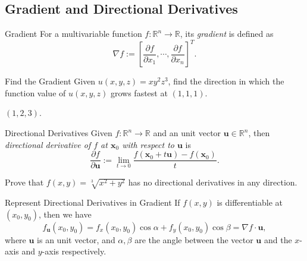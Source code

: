\subsection{Gradient and Directional Derivatives}

\begin{definition}{Gradient}{}
  For a multivariable function $f: \mathbb{R}^n \rightarrow \mathbb{R}$,
  its \emph{gradient} is defined as
  \begin{equation}
    \nabla f := \left[ \frac{\partial f}{\partial x_1},\cdots,\frac{\partial f}{\partial x_n} \right]^T.
  \end{equation}
\end{definition}

\begin{example}{Find the Gradient}{}
  Given $u(x,y,z) = xy^2z^3$, find the direction in which the function value of
  $u(x, y, z)$ grows fastest at $(1,1,1)$.
\end{example}

\begin{solution}
  $(1,2,3)$.
\end{solution}

\begin{definition}{Directional Derivatives}{}
  Given $f: \mathbb{R}^n \rightarrow \mathbb{R}$ and an unit vector $\mathbf{u}
  \in \mathbb{R}^n$, then \emph{directional derivative of $f$ at $\mathbf{x}_0$ with respect to $\mathbf{u}$}
  is
  \begin{equation}
    \frac{\partial f}{\partial \mathbf{u}} := \lim \limits _{t \rightarrow 0} \frac{f(\mathbf{x}_0 + t\mathbf{u}) - f(\mathbf{x}_0)}{t}.
  \end{equation}
\end{definition}

\begin{example}{}{}
  Prove that $f(x,y) = \sqrt[3]{x^2 + y^2}$ has no directional derivatives in
  any direction.
\end{example}

\begin{proposition}{Represent Directional Derivatives in Gradient}{}
  If $f(x, y)$ is differentiable at $(x_0, y_0)$,
  then we have
  \begin{equation}
    f_{\mathbf{u}}(x_0, y_0) = f_x(x_0, y_0) \cos \alpha + f_y(x_0, y_0) \cos \beta = \nabla f \cdot \mathbf{u},
  \end{equation}
  where $\mathbf{u}$ is an unit vector, and $\alpha, \beta$ are the angle
  between the vector $\mathbf{u}$ and the $x$-axis and $y$-axis respectively.
\end{proposition}

